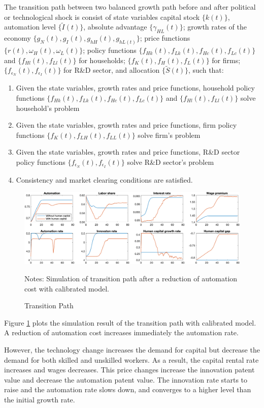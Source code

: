 \documentclass[12pt]{article}
\begin{document}
The transition path between two balanced growth path before and after political or technological shock is consist of state variables capital stock $\{k(t)\}$, automation level $\{\tilde{I}(t)\}$, absolute advantage $\{\gamma_{HL}(t)\}$; growth rates of the economy $\{g_N(t), g_I(t), g_{hH}(t),g_{hL(t)}\}$; price functions $\{r(t), \omega_H(t), \omega_L(t)\}$; policy functions $\{f_{Hk}(t), f_{Lk}(t), f_{Hc}(t), f_{Lc}(t)\}$ and $\{f_{Hl}(t), f_{Ll}(t)\}$ for households; $\{f_{K}(t), f_{H}(t), f_{L}(t)\}$ for firms; $\{f_{\epsilon_N}(t), f_{\epsilon_I}(t)\}$ for R\&D sector, and allocation $\{\tilde{S}(t)\}$, such that: 
\begin{enumerate}
\item Given the state variables, growth rates and price functions, household policy functions  $\{f_{Hk}(t), f_{Lk}(t), f_{Hc}(t), f_{Lc}(t)\}$ and $\{f_{Hl}(t), f_{Ll}(t)\}$ solve household's problem
\item Given the state variables, growth rates and price functions, firm policy functions $\{f_{K}(t), f_{LH}(t), f_{LL}(t)\}$ solve firm's problem
\item Given the state variables, growth rates and price functions, R\&D sector policy functions $\{f_{\epsilon_N}(t), f_{\epsilon_I}(t)\}$ solve  R\&D sector's problem
\item Consistency and market clearing conditions are satisfied. 
\end{enumerate}

\begin{figure}[h!]
\includegraphics[width=\textwidth]{Transition}
\caption{Transition Path}
\label{transition}
{\scriptsize Notes: Simulation of transition path after a reduction of automation cost with calibrated model. }
\end{figure}

Figure \ref{transition} plots the simulation result of the transition path with calibrated model. A reduction of automation cost increases immediately the automation rate. 

However, the technology change increases the demand for capital but decrease the demand for both skilled and unskilled workers. As a result, the capital rental rate increases and wages decreases. This price changes increase the innovation patent value and decrease the automation patent value. The innovation rate starts to raise and the automation rate slows down, and converges to a higher level than the initial growth rate. 
\end{document}
